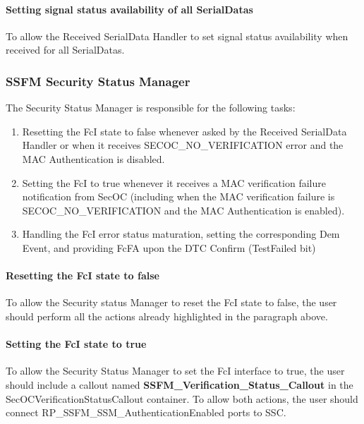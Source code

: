 \paragraph{Setting signal status availability of all SerialDatas}
To allow the Received SerialData Handler to set signal status availability when received for all SerialDatas.

\subsubsection{SSFM Security Status Manager}
\label{subsec:securitystatusmanager}

The Security Status Manager is responsible for the following tasks:

\begin{enumerate}
\item Resetting the FcI state to false whenever asked by the Received SerialData Handler or when it receives SECOC\_NO\_VERIFICATION error and the MAC Authentication is disabled.
\item Setting the FcI to true whenever it receives a MAC verification failure notification from SecOC (including when the MAC verification failure is SECOC\_NO\_VERIFICATION and the MAC Authentication is enabled).
\item Handling the FcI error status maturation, setting the corresponding Dem Event, and providing FcFA upon the DTC Confirm (TestFailed bit)
\end{enumerate}

\paragraph{Resetting the FcI state to false}
To allow the Security status Manager to reset the FcI state to false, the user should perform all the actions already highlighted in the paragraph above.

\paragraph{Setting the FcI state to true}
To allow the Security Status Manager to set the FcI interface to true, the user should include a callout named \textbf{SSFM\_Verification\_Status\_Callout} in the SecOCVerificationStatusCallout container.
To allow both actions, the user should connect RP\_SSFM\_SSM\_AuthenticationEnabled ports to SSC.

